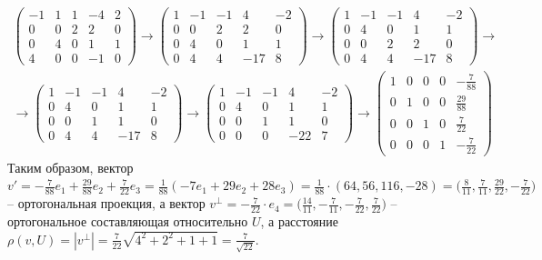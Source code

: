 \documentclass[a4paper, 12pt]{article}
\begin{document}
\begin{spacing}{1}
\begin{gather*}
	\left(\begin{array}{cccc|c}
		-1 & 1 & 1 & -4 & 2\\
		0 & 0 & 2 & 2 & 0\\
		0 & 4 & 0 & 1 & 1\\
		4 & 0 & 0 & -1 & 0
	\end{array}\right) \rightarrow
	\left(\begin{array}{cccc|c}
	1 & -1 & -1 & 4 & -2\\
	0 & 0 & 2 & 2 & 0\\
	0 & 4 & 0 & 1 & 1\\
	0 & 4 & 4 & -17 & 8
	\end{array}\right) \rightarrow
	\left(\begin{array}{cccc|c}
	1 & -1 & -1 & 4 & -2\\
	0 & 4 & 0 & 1 & 1\\
	0 & 0 & 2 & 2 & 0\\
	0 & 4 & 4 & -17 & 8
	\end{array}\right)\rightarrow 	\\ \rightarrow
	\left(\begin{array}{cccc|c}
	1 & -1 & -1 & 4 & -2\\
	0 & 4 & 0 & 1 & 1\\
	0 & 0 & 1 & 1 & 0\\
	0 & 4 & 4 & -17 & 8
	\end{array}\right) \rightarrow
	\left(\begin{array}{cccc|c}
	1 & -1 & -1 & 4 & -2\\
	0 & 4 & 0 & 1 & 1\\
	0 & 0 & 1 & 1 & 0\\
	0 & 0 & 0 & -22 & 7
	\end{array}\right) \rightarrow
	\left(\begin{array}{cccc|c}
	1 & 0 & 0 & 0 & -\frac{7}{88}\\[3pt]
	0 & 1 & 0 & 0 & \frac{29}{88}\\[3pt]
	0 & 0 & 1 & 0 & \frac{7}{22}\\[3pt]
	0 & 0 & 0 & 1 & -\frac{7}{22}
	\end{array}\right)
\end{gather*}
Таким образом, вектор $\displaystyle v' = -\frac{7}{88}e_1 + \frac{29}{88}e_2 + \frac{7}{22}e_3 = \frac{1}{88}(-7e_1 + 29e_2 + 28e_3) = \frac{1}{88}\cdot (64, 56, 116, -28) = \bigg(\frac{8}{11}, \frac{7}{11}, \frac{29}{22}, -\frac{7}{22}\bigg)$ -- ортогональная проекция, а вектор $\displaystyle v^\perp = -\frac{7}{22}\cdot e_4 = \bigg(\frac{14}{11}, -\frac{7}{11}, -\frac{7}{22}, \frac{7}{22}\bigg)$ -- ортогональное составляющая относительно $U$, а расстояние $\rho(v, U) = |v^\perp| = \frac{7}{22}\sqrt{4^2 + 2^2 + 1+1} = \frac{7}{\sqrt{22}}$.









\end{spacing}
\end{document}

